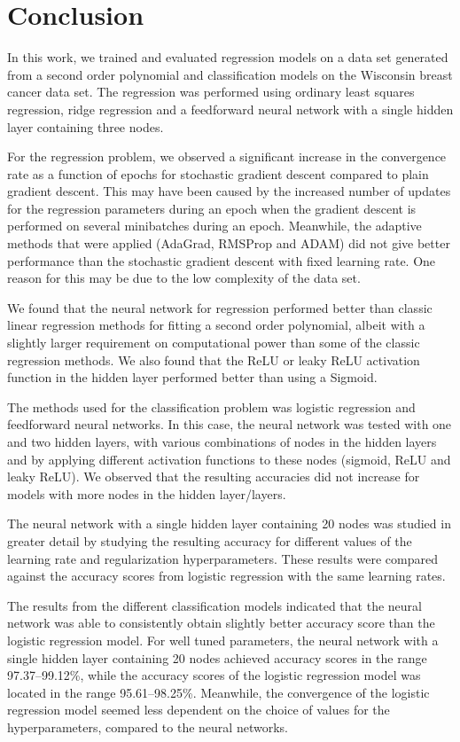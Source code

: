 \documentclass[12pt]{article}
\begin{document}
\section{Conclusion} \label{sec:conclusion}


In this work, we trained and evaluated regression models on a data set generated from a second order polynomial and classification models on the Wisconsin breast cancer data set. The regression was performed using ordinary least squares regression, ridge regression and a feedforward neural network with a single hidden layer containing three nodes. 

For the regression problem, we observed a significant increase in the convergence rate as a function of epochs for stochastic gradient descent compared to plain gradient descent. This may have been caused by the increased number of updates for the regression parameters during an epoch when the gradient descent is performed on several minibatches during an epoch. Meanwhile, the adaptive methods that were applied (AdaGrad, RMSProp and ADAM) did not give better performance than the stochastic gradient descent with fixed learning rate. One reason for this may be due to the low complexity of the data set.

We found that the neural network for regression performed better than classic linear regression methods for fitting a second order polynomial, albeit with a slightly larger requirement on computational power than some of the classic regression methods. We also found that the ReLU or leaky ReLU activation function in the hidden layer performed better than using a Sigmoid. 

The methods used for the classification problem was logistic regression and feedforward neural networks. In this case, the neural network was tested with one and two hidden layers, with various combinations of nodes in the hidden layers and by applying different activation functions to these nodes (sigmoid, ReLU and leaky ReLU). We observed that the resulting accuracies did not increase for models with more nodes in the hidden layer/layers.

The neural network with a single hidden layer containing 20 nodes was studied in greater detail by studying the resulting accuracy for different values of the learning rate and regularization hyperparameters. These results were compared against the accuracy scores from logistic regression with the same learning rates. 

The results from the different classification models indicated that the neural network was able to consistently obtain slightly better accuracy score than the logistic regression model. For well tuned parameters, the neural network with a single hidden layer containing 20 nodes achieved accuracy scores in the range \numrange[range-phrase = --]{97.37}{99.12}\%, while the accuracy scores of the logistic regression model was located in the range \numrange[range-phrase = --]{95.61}{98.25}\%. Meanwhile, the convergence of the logistic regression model seemed less dependent on the choice of values for the hyperparameters, compared to the neural networks.

\printbibliography
\end{document}
